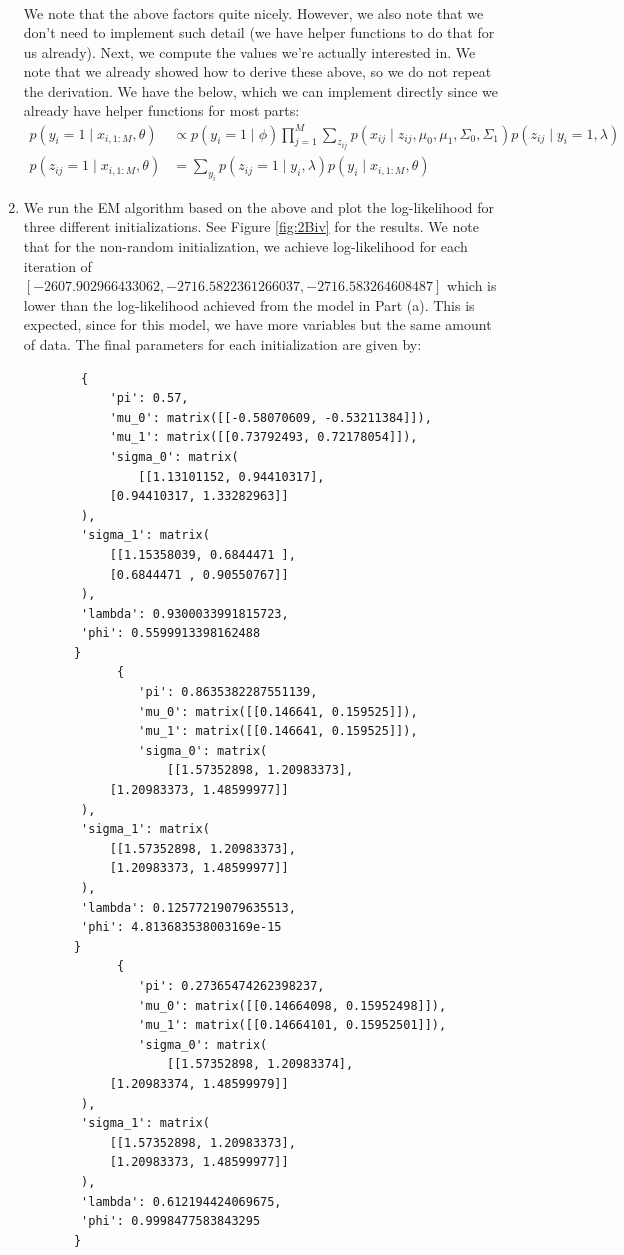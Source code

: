 \documentclass[12pt]{article}
\begin{document}
\begin{enumerate}[label=(\Alph*)]
\begin{align*}
  	\end{align*}
  	We note that the above factors quite nicely. However, we also note that we don't need to implement such detail (we have helper functions to do that for us already). Next, we compute the values we're actually interested in. We note that we already showed how to derive these above, so we do not repeat the derivation. We have the below, which we can implement directly since we already have helper functions for most parts:
  	\begin{align*}
  		p(y_i = 1 \mid x_{i, 1:M}, \theta) &\propto p(y_i = 1\mid \phi) \prod_{j=1}^M\sum_{z_{ij}}p(x_{ij} \mid z_{ij}, \mu_0, \mu_1, \Sigma_0, \Sigma_1)p(z_{ij} \mid y_i = 1, \lambda) \\
  		p(z_{ij} = 1 \mid x_{i, 1:M}, \theta) &= \sum_{y_i}p(z_{ij} = 1 \mid y_i, \lambda)p(y_i \mid x_{i, 1:M}, \theta)
  	\end{align*}
  	\item We run the EM algorithm based on the above and plot the log-likelihood for three different initializations. See Figure \ref{fig:2Biv} for the results. We note that for the non-random initialization, we achieve log-likelihood for each iteration of $[-2607.902966433062, -2716.5822361266037, -2716.583264608487]$ which is lower than the log-likelihood achieved from the model in Part (a). This is expected, since for this model, we have more variables but the same amount of data. The final parameters for each initialization are given by:
  	\begin{verbatim}
  		{
  			'pi': 0.57,
  			'mu_0': matrix([[-0.58070609, -0.53211384]]),
  			'mu_1': matrix([[0.73792493, 0.72178054]]),
  			'sigma_0': matrix(
  				[[1.13101152, 0.94410317],
        	[0.94410317, 1.33282963]]
        ),
        'sigma_1': matrix(
        	[[1.15358039, 0.6844471 ],
        	[0.6844471 , 0.90550767]]
        ),
        'lambda': 0.9300033991815723,
        'phi': 0.5599913398162488
       }
			 {
			 	'pi': 0.8635382287551139,
			 	'mu_0': matrix([[0.146641, 0.159525]]),
			 	'mu_1': matrix([[0.146641, 0.159525]]),
			 	'sigma_0': matrix(
			 		[[1.57352898, 1.20983373],
        	[1.20983373, 1.48599977]]
        ),
        'sigma_1': matrix(
        	[[1.57352898, 1.20983373],
        	[1.20983373, 1.48599977]]
        ),
        'lambda': 0.12577219079635513,
        'phi': 4.813683538003169e-15
       }
			 {
			 	'pi': 0.27365474262398237,
			 	'mu_0': matrix([[0.14664098, 0.15952498]]),
			 	'mu_1': matrix([[0.14664101, 0.15952501]]),
			 	'sigma_0': matrix(
			 		[[1.57352898, 1.20983374],
        	[1.20983374, 1.48599979]]
        ),
        'sigma_1': matrix(
        	[[1.57352898, 1.20983373],
        	[1.20983373, 1.48599977]]
        ),
        'lambda': 0.612194424069675,
        'phi': 0.9998477583843295
       }


\end{verbatim}
\end{enumerate}
\end{document}
